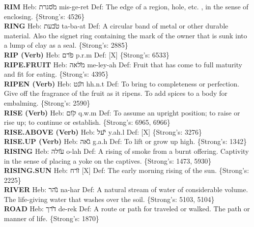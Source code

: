 {\textbf{RIM} Heb: {\large\H מסגרת} mis-ge-ret Def: The edge of a region, hole, etc. , in the sense of enclosing. \{Strong's: 4526\}\hfill{}\\

\textbf{RING} Heb: {\large\H טבעת} ta-ba-at Def: A circular band of metal or other durable material. Also the signet ring containing the mark of the owner that is sunk into a lump of clay as a seal. \{Strong's: 2885\}\hfill{}\\

\textbf{RIP (Verb)} Heb: {\large\H פרם} p.r.m Def: {[}X{]} \{Strong's: 6533\}\hfill{}\\

\textbf{RIPE.FRUIT} Heb: {\large\H מלאה} me-ley-ah Def: Fruit that has come to full maturity and fit for eating. \{Strong's: 4395\}\hfill{}\\

\textbf{RIPEN (Verb)} Heb: {\large\H חנט} hh.n.t Def: To bring to completeness or perfection. Give off the fragrance of the fruit as it ripens. To add spices to a body for embalming. \{Strong's: 2590\}\hfill{}\\

\textbf{RISE (Verb)} Heb: {\large\H קום} q.w.m Def: To assume an upright position; to raise or rise up; to continue or establish. \{Strong's: 6965, 6966\}\hfill{}\\

\textbf{RISE.ABOVE (Verb)} Heb: {\large\H יעל} y.ah.l Def: {[}X{]} \{Strong's: 3276\}\hfill{}\\

\textbf{RISE.UP (Verb)} Heb: {\large\H גאה} g.a.h Def: To lift or grow up high. \{Strong's: 1342\}\hfill{}\\

\textbf{RISING} Heb: {\large\H עולה} o-lah Def: A rising of smoke from a burnt offering. Captivity in the sense of placing a yoke on the captives. \{Strong's: 1473, 5930\}\hfill{}\\

\textbf{RISING.SUN} Heb: {\large\H זרח} {[}X{]} Def: The early morning rising of the sun. \{Strong's: 2225\}\hfill{}\\

\textbf{RIVER} Heb: {\large\H נהר} na-har Def: A natural stream of water of considerable volume. The life-giving water that washes over the soil. \{Strong's: 5103, 5104\}\hfill{}\\

\textbf{ROAD} Heb: {\large\H דרך} de-rek Def: A route or path for traveled or walked. The path or manner of life. \{Strong's: 1870\}\hfill{}\\

}
